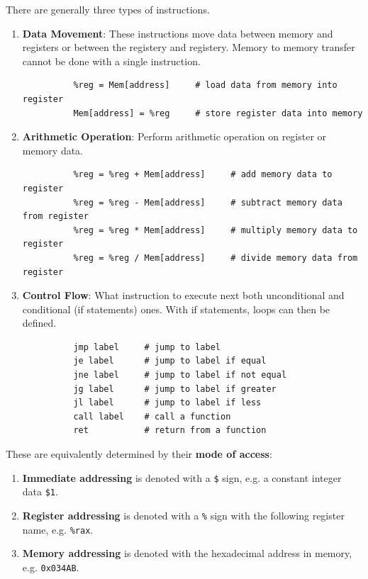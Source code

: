   \begin{definition}
    \label{def:types-of-instructions}
    There are generally three types of instructions. 
    \begin{enumerate} 
      \item \textbf{Data Movement}: These instructions move data between memory and registers or between the registery and registery. Memory to memory transfer cannot be done with a single instruction. 
        \begin{lstlisting} 
          %reg = Mem[address]     # load data from memory into register
          Mem[address] = %reg     # store register data into memory
        \end{lstlisting}
      \item \textbf{Arithmetic Operation}: Perform arithmetic operation on register or memory data. 
        \begin{lstlisting} 
          %reg = %reg + Mem[address]     # add memory data to register
          %reg = %reg - Mem[address]     # subtract memory data from register
          %reg = %reg * Mem[address]     # multiply memory data to register
          %reg = %reg / Mem[address]     # divide memory data from register
        \end{lstlisting}
      \item \textbf{Control Flow}: What instruction to execute next both unconditional and conditional (if statements) ones. With if statements, loops can then be defined. 
        \begin{lstlisting} 
          jmp label     # jump to label
          je label      # jump to label if equal
          jne label     # jump to label if not equal
          jg label      # jump to label if greater
          jl label      # jump to label if less
          call label    # call a function
          ret           # return from a function
        \end{lstlisting}
    \end{enumerate}
  \end{definition}

  \begin{definition}
    \label{def:types-of-operands}

    These are equivalently determined by their \textbf{mode of access}:
    \begin{enumerate} 
      \item \textbf{Immediate addressing} is denoted with a \texttt{\$} sign, e.g. a constant integer data \texttt{\$1}. 
      \item \textbf{Register addressing} is denoted with a \texttt{\%} sign with the following register name, e.g. \texttt{\%rax}.
      \item \textbf{Memory addressing} is denoted with the hexadecimal address in memory, e.g. \texttt{0x034AB}.
    \end{enumerate}
  \end{definition}

